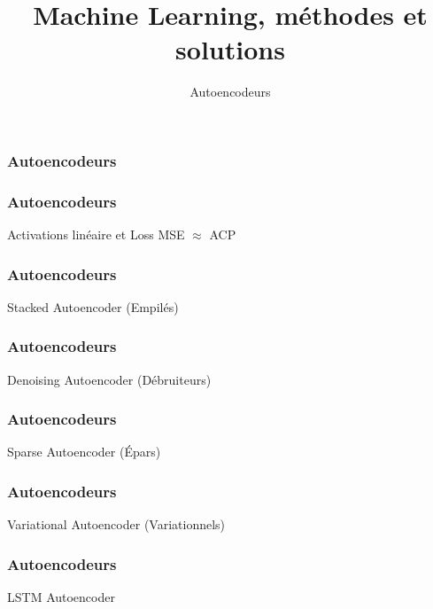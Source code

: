 \documentclass{formation}
\title{Machine Learning, méthodes et solutions}
\subtitle{Autoencodeurs}
\begin{document}
\maketitle

\begin{frame}
  \frametitle{Autoencodeurs}
\end{frame}

\begin{frame}
  \frametitle{Autoencodeurs}
  Activations linéaire et Loss MSE $\approx$ ACP
\end{frame}

\begin{frame}
  \frametitle{Autoencodeurs}
  Stacked Autoencoder (Empilés)
\end{frame}

\begin{frame}
  \frametitle{Autoencodeurs}
  Denoising Autoencoder (Débruiteurs)
\end{frame}

\begin{frame}
  \frametitle{Autoencodeurs}
  Sparse Autoencoder (Épars)
\end{frame}

\begin{frame}
  \frametitle{Autoencodeurs}
  Variational Autoencoder (Variationnels)
\end{frame}

\begin{frame}
  \frametitle{Autoencodeurs}
  LSTM Autoencoder
\end{frame}
\end{document}
